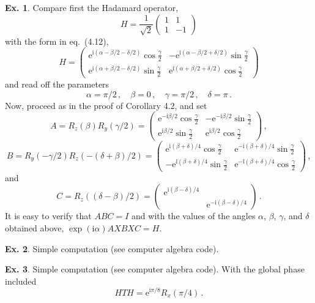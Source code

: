 \documentclass[a4paper,12pt]{article}
\def\e{\mathrm{e}}
\def\imagi{\mathrm{i}}
\theoremstyle{definition}
\newtheorem{exercise}{Ex.}[section]
\begin{document}
\begin{exercise}
 Compare first the Hadamard operator,
 \[
  H = \frac{1}{\sqrt{2}} \begin{pmatrix}1 & 1\\ 1 & -1 \end{pmatrix}
 \]
 with the form in eq.\ (4.12),
 \[
  H = \begin{pmatrix}
       \e^{\imagi(\alpha-\beta/2-\delta/2)}\cos\frac{\gamma}{2} & -\e^{\imagi(\alpha-\beta/2+\delta/2)}\sin\frac{\gamma}{2}\\
       \e^{\imagi(\alpha+\beta/2-\delta/2)}\sin\frac{\gamma}{2} & \e^{\imagi(\alpha+\beta/2+\delta/2)}\cos\frac{\gamma}{2}
      \end{pmatrix}
 \]
 and read off the parameters
 \[
  \alpha = \pi/2\,,\quad \beta=0\,,\quad \gamma=\pi/2\,,\quad \delta = \pi\,.
 \]
 Now, proceed as in the proof of Corollary 4.2, and set
 \[
  A = R_z(\beta) R_y(\gamma/2) =
  \begin{pmatrix}
   \e^{-\imagi\beta/2}\cos\frac{\gamma}{2} & -\e^{-\imagi\beta/2}\sin\frac{\gamma}{2} \\
   \e^{\imagi\beta/2}\sin\frac{\gamma}{2} & \e^{\imagi\beta/2}\cos\frac{\gamma}{2}
  \end{pmatrix}\,,
 \]
 \[
  B = R_y(-\gamma/2) R_z(-(\delta+\beta)/2) =
  \begin{pmatrix}
   \e^{\imagi(\beta+\delta)/4}\cos\frac{\gamma}{2} & \e^{-\imagi(\beta+\delta)/4}\sin\frac{\gamma}{2} \\
   -\e^{\imagi(\beta+\delta)/4}\sin\frac{\gamma}{2} & \e^{-\imagi(\beta+\delta)/4}\cos\frac{\gamma}{2}
  \end{pmatrix}\,,
 \]
 and
 \[
  C = R_z((\delta-\beta)/2) =
  \begin{pmatrix}
   \e^{\imagi(\beta-\delta)/4} & \\ & \e^{-\imagi(\beta-\delta)/4}
  \end{pmatrix}\,.
 \]
 It is easy to verify that $ABC=I$ and with the values of the angles $\alpha$, $\beta$, $\gamma$, and $\delta$  obtained above, $\exp(\imagi \alpha) AXBXC = H$.
\end{exercise}

\begin{exercise}
 Simple computation (see computer algebra code).
\end{exercise}

\begin{exercise}
 Simple computation (see computer algebra code). With the global phase included
 \[
  H T H = \e^{\imagi \pi/8} R_x(\pi/4)\,.
 \]
\end{exercise}
\end{document}
